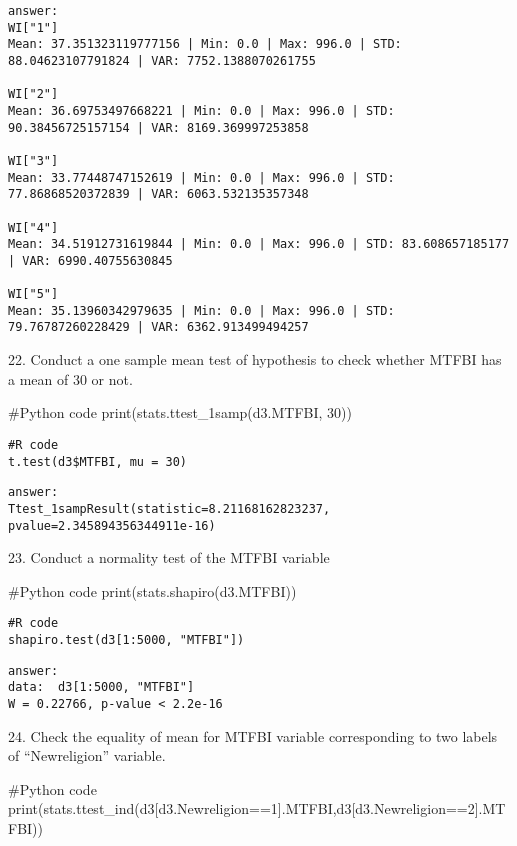 \documentclass{article}
\begin{document}
\begin{verbatim}
answer: 
WI["1"]
Mean: 37.351323119777156 | Min: 0.0 | Max: 996.0 | STD: 88.04623107791824 | VAR: 7752.1388070261755

WI["2"]
Mean: 36.69753497668221 | Min: 0.0 | Max: 996.0 | STD: 90.38456725157154 | VAR: 8169.369997253858

WI["3"]
Mean: 33.77448747152619 | Min: 0.0 | Max: 996.0 | STD: 77.86868520372839 | VAR: 6063.532135357348

WI["4"]
Mean: 34.51912731619844 | Min: 0.0 | Max: 996.0 | STD: 83.608657185177 | VAR: 6990.40755630845

WI["5"]
Mean: 35.13960342979635 | Min: 0.0 | Max: 996.0 | STD: 79.76787260228429 | VAR: 6362.913499494257
\end{verbatim}


22.	Conduct a one sample mean test of hypothesis to check whether MTFBI has a mean of 30 or not.
\begin{pythoncode}
#Python code
print(stats.ttest_1samp(d3.MTFBI, 30))
\end{pythoncode}

\begin{verbatim}
#R code
t.test(d3$MTFBI, mu = 30)
\end{verbatim}

\begin{verbatim}
answer: 
Ttest_1sampResult(statistic=8.21168162823237, pvalue=2.345894356344911e-16)
\end{verbatim}


23.	Conduct a normality test of the MTFBI variable
\begin{pythoncode}
#Python code
print(stats.shapiro(d3.MTFBI))
\end{pythoncode}

\begin{verbatim}
#R code
shapiro.test(d3[1:5000, "MTFBI"])
\end{verbatim}

\begin{verbatim}
answer: 
data:  d3[1:5000, "MTFBI"]
W = 0.22766, p-value < 2.2e-16
\end{verbatim}


24.	Check the equality of mean for MTFBI variable corresponding to two labels of “Newreligion” variable.
\begin{pythoncode}
#Python code
print(stats.ttest_ind(d3[d3.Newreligion==1].MTFBI,d3[d3.Newreligion==2].MTFBI))
\end{pythoncode}
\end{document}
